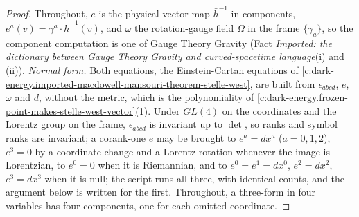 \documentclass[11pt]{article}
\theoremstyle{definition}
\theoremstyle{plain}
\providecommand{\hb}{}\renewcommand{\hb}{\bar{h}}
\begin{document}
\begin{proof}
Throughout, $e$ is the physical-vector map $\hb^{-1}$ in components, $e^a(v) = \gamma^a \cdot \hb^{-1}(v)$, and $\omega$ the rotation-gauge field $\Omega$ in the frame $\{\gamma_a\}$, so the component computation is one of Gauge Theory Gravity (Fact \emph{Imported: the dictionary between Gauge Theory Gravity and curved-spacetime language}(i) and (ii)). \emph{Normal form.} Both equations, the Einstein-Cartan equations of \ref{c:dark-energy.imported-macdowell-mansouri-theorem-stelle-west}, are built from $\epsilon_{abcd}$, $e$, $\omega$ and $d$, without the metric, which is the polynomiality of \ref{c:dark-energy.frozen-point-makes-stelle-west-vector}(1). Under $GL(4)$ on the coordinates and the Lorentz group on the frame, $\epsilon_{abcd}$ is invariant up to $\det$, so ranks and symbol ranks are invariant; a corank-one $e$ may be brought to $e^a = dx^a$ ($a = 0,1,2$), $e^3 = 0$ by a coordinate change and a Lorentz rotation whenever the image is Lorentzian, to $e^0 = 0$ when it is Riemannian, and to $e^0 = e^1 = dx^0$, $e^2 = dx^2$, $e^3 = dx^3$ when it is null; the script runs all three, with identical counts, and the argument below is written for the first. Throughout, a three-form in four variables has four components, one for each omitted coordinate.


\end{proof}
\end{document}
